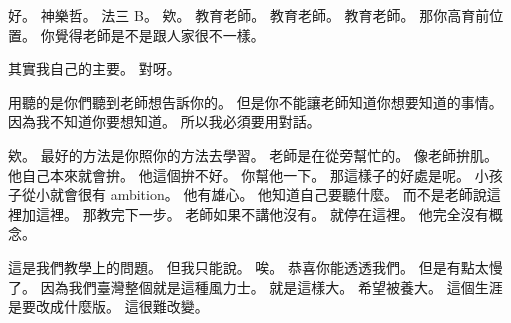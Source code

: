 \hypertarget{c01:cue:2110}{}好。
\hypertarget{c01:cue:2111}{}神樂哲。
\hypertarget{c01:cue:2112}{}法三 B。
\hypertarget{c01:cue:2113}{}欸。
\hypertarget{c01:cue:2114}{}教育老師。
\hypertarget{c01:cue:2115}{}教育老師。
\hypertarget{c01:cue:2116}{}教育老師。
\hypertarget{c01:cue:2117}{}那你高育前位置。
\hypertarget{c01:cue:2118}{}你覺得老師是不是跟人家很不一樣。

\hypertarget{c01:cue:2119}{}其實我自己的主要。
\hypertarget{c01:cue:2120}{}對呀。

\hypertarget{c01:cue:2121}{}用聽的是你們聽到老師想告訴你的。
\hypertarget{c01:cue:2122}{}但是你不能讓老師知道你想要知道的事情。
\hypertarget{c01:cue:2123}{}因為我不知道你要想知道。
\hypertarget{c01:cue:2124}{}所以我必須要用對話。

\hypertarget{c01:cue:2125}{}欸。
\hypertarget{c01:cue:2126}{}最好的方法是你照你的方法去學習。
\hypertarget{c01:cue:2127}{}老師是在從旁幫忙的。
\hypertarget{c01:cue:2128}{}像老師拚肌。
\hypertarget{c01:cue:2129}{}他自己本來就會拚。
\hypertarget{c01:cue:2130}{}他這個拚不好。
\hypertarget{c01:cue:2131}{}你幫他一下。
\hypertarget{c01:cue:2132}{}那這樣子的好處是呢。
\hypertarget{c01:cue:2133}{}小孩子從小就會很有 ambition。
\hypertarget{c01:cue:2134}{}他有雄心。
\hypertarget{c01:cue:2135}{}他知道自己要聽什麼。
\hypertarget{c01:cue:2136}{}而不是老師說這裡加這裡。
\hypertarget{c01:cue:2137}{}那教完下一步。
\hypertarget{c01:cue:2138}{}老師如果不講他沒有。
\hypertarget{c01:cue:2139}{}就停在這裡。
\hypertarget{c01:cue:2140}{}他完全沒有概念。

\hypertarget{c01:cue:2141}{}這是我們教學上的問題。
\hypertarget{c01:cue:2142}{}但我只能說。
\hypertarget{c01:cue:2143}{}唉。
\hypertarget{c01:cue:2144}{}恭喜你能透透我們。
\hypertarget{c01:cue:2145}{}但是有點太慢了。
\hypertarget{c01:cue:2146}{}因為我們臺灣整個就是這種風力士。
\hypertarget{c01:cue:2147}{}就是這樣大。
\hypertarget{c01:cue:2148}{}希望被養大。
\hypertarget{c01:cue:2149}{}這個生涯是要改成什麼版。
\hypertarget{c01:cue:2150}{}這很難改變。

